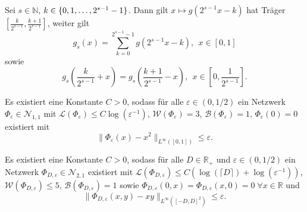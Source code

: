 \documentclass[11pt]{scrartcl}
\newcommand{\N}{\mathbb{N}} %
\newcommand{\R}{\mathbb{R}} %
\newcommand{\norm}[1]{\| #1 \|}
\begin{document}
\begin{center}
\end{center}

\begin{lemma*}
    Sei \(s\in\N\), \(k \in \{0,1,\ldots, 2^{s-1}-1\}\). Dann gilt \(x \mapsto g(2^{s-1} x - k)\) 
    hat Träger \(\left[\frac{k}{2^{s-1}}, \frac{k+1}{2^{s-1}} \right]\), weiter gilt 
    \[ g_s(x) = \sum_{k=0}^{2^{s-1}-1} g(2^{s-1}x - k),\ \ x\in [0,1] \]
    sowie 
    \[ g_s\left(\frac{k}{2^{s-1}}+x\right) = g_s\left(\frac{k+1}{2^{s-1}} - x\right), \ \ x \in \left[0, \frac{1}{2^{s-1}}\right]. \]
\end{lemma*}

\begin{proposition} %
    Es existiert eine Konstante \(C>0\), sodass für alle \(\varepsilon \in (0,1/2)\) 
    ein Netzwerk \(\Phi_\varepsilon \in \mathcal{N}_{1,1}\) mit 
    \(\mathcal{L}(\Phi_\varepsilon) \leq C\log(\varepsilon^{-1})\), 
    \(\mathcal{W}(\Phi_\varepsilon) = 3\), \(\mathcal{B}(\Phi_\varepsilon) = 1\), 
    \(\Phi_\varepsilon(0) = 0\) existiert mit 
    \[ \norm{\Phi_\varepsilon(x) - x^2 }_{L^\infty([0,1])} \leq \varepsilon. \]
\end{proposition}

\begin{proposition} %
    Es existiert eine Konstante \(C>0\), sodass für alle \(D\in \R_+\) und \(\varepsilon \in (0, 1/2)\) 
    ein Netzwerk \(\Phi_{D,\varepsilon} \in \mathcal{N}_{2,1}\) existiert mit 
    \(\mathcal{L}(\Phi_{D, \varepsilon}) \leq C (\log(\lceil D \rceil) + \log(\varepsilon^{-1})) \), 
    \(\mathcal{W}(\Phi_{D, \varepsilon}) \leq 5\), \(\mathcal{B}(\Phi_{D, \varepsilon}) = 1\) sowie 
    \(\Phi_{D,\varepsilon}(0,x) = \Phi_{D,\varepsilon}(x,0) = 0 \;\forall x\in \R\) und 
    \[ \norm{\Phi_{D,\varepsilon}(x,y) - xy}_{L^\infty([-D,D]^2)} \leq \varepsilon. \]
\end{proposition}
\end{document}
